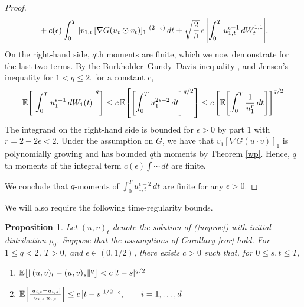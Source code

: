 \documentclass[11pt, twoside]{report}
\newtheorem{proposition}[theorem]{Proposition}
\begin{document}
\begin{proof}
\begin{align*}
&\quad+ c(\epsilon)\int_0^T |v_{1,t} \,[\nabla G(u_t\odot v_t)]_1|^{(2-\epsilon)}\,dt+\sqrt\frac{2}{\beta} \,\epsilon\,\abs{\int_0^T u_{1,t}^{\epsilon-1}\,dW^{1,1}_t}.
\end{align*}
On the right-hand side, $q$th moments are finite, which we now demonstrate for the last two terms. By the Burkholder--Gundy--Davis inequality \cite[Theorem 3.28]{Karatzas1991-xr}, and Jensen's inequality for $1 < q \le 2$, for a constant $c$,
\[
\mean{\abs{\int_0^T u_1^{\epsilon-1}\,dW_1(t)}^q}
\le c\,
\mean{\bp{\int_0^T {u_1^{2\epsilon-2}}\,dt}^{q/2}}
\le c\,
\bp{\mean{\int_0^T \frac{1}{u_1^{r}}\,dt}}^{q/2}
\]
The integrand on the right-hand side is bounded for $\epsilon>0$ by part 1 with $r=2-2\epsilon<2$. 
Under the assumption on $G$, we have that $v_1 [\nabla G (u\cdot v)]_1$ is polynomially growing and has bounded $q$th moments by Theorem \ref{wp}.  Hence, $q$th moments of the integral term $c(\epsilon)\int \cdots\,dt$ are finite.
   
   We conclude that $q$-moments of $\int_0^T {u_{1,t}^{\epsilon-2}}\,dt$ are finite for any $\epsilon>0$.
\end{proof}
We will also require the following time-regularity bounds. 
\begin{proposition} \label{timeregbnd} Let $(u,v)_t$ denote the solution of (\ref{uvproc}) with initial distribution $\rho_0$. Suppose that the assumptions of Corollary \ref{cor} hold. For $1\le q< 2$, $T>0$, and $\epsilon\in(0,1/2)$,  there exists $c>0$ such that, for $0\le s,t\le T$,
\begin{enumerate}
    \item $\mathbb{E} \bp{ {\|(u,v)_t-(u,v)_s\|^q}\strutb}<c\, |t-s|^{q/2}$
    \item $\mathbb{E} \bp{\frac {|u_{i,t}-u_{i,s}|}{u_{i,s}\,u_{i,t}}}\le c\, |t-s|^{1/2-\epsilon},\qquad i=1,\dots,d$
\end{enumerate}

\end{proposition}
\end{document}
